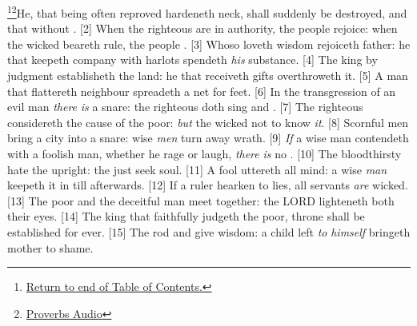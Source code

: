 \footnote{\textcolor[cmyk]{0.99998,1,0,0}{\hyperlink{TOC}{Return to end of Table of Contents.}}}\footnote{\href{https://audiobible.com/bible}{\textcolor[cmyk]{0.99998,1,0,0}{Proverbs Audio}}}\textcolor[cmyk]{0.99998,1,0,0}{He, that being often reproved hardeneth  neck, shall suddenly be destroyed, and that without .}
[2] \textcolor[cmyk]{0.99998,1,0,0}{When the righteous are in authority, the people rejoice:  when the wicked beareth rule, the people .}
[3] \textcolor[cmyk]{0.99998,1,0,0}{Whoso loveth wisdom rejoiceth  father:  he that keepeth company with harlots spendeth \emph{his} substance.}
[4] \textcolor[cmyk]{0.99998,1,0,0}{The king by judgment establisheth the land:  he that receiveth gifts overthroweth it.}
[5] \textcolor[cmyk]{0.99998,1,0,0}{A man that flattereth  neighbour spreadeth a net for  feet.}
[6] \textcolor[cmyk]{0.99998,1,0,0}{In the transgression of an evil man \emph{there} \emph{is} a snare:  the righteous doth sing and .}
[7] \textcolor[cmyk]{0.99998,1,0,0}{The righteous considereth the cause of the poor: \emph{but} the wicked  not to know \emph{it}.}
[8] \textcolor[cmyk]{0.99998,1,0,0}{Scornful men bring a city into a snare:  wise \emph{men} turn away wrath.}
[9] \textcolor[cmyk]{0.99998,1,0,0}{\emph{If} a wise man contendeth with a foolish man, whether he rage or laugh, \emph{there} \emph{is} no .}
[10] \textcolor[cmyk]{0.99998,1,0,0}{The bloodthirsty hate the upright:  the just seek  soul.}
[11] \textcolor[cmyk]{0.99998,1,0,0}{A fool uttereth all  mind:  a wise \emph{man} keepeth it in till afterwards.}
[12] \textcolor[cmyk]{0.99998,1,0,0}{If a ruler hearken to lies, all  servants \emph{are} wicked.}
[13] \textcolor[cmyk]{0.99998,1,0,0}{The poor and the deceitful man meet together: the LORD lighteneth both their eyes.}
[14] \textcolor[cmyk]{0.99998,1,0,0}{The king that faithfully judgeth the poor,  throne shall be established for ever.}
[15] \textcolor[cmyk]{0.99998,1,0,0}{The rod and  give wisdom:  a child left \emph{to} \emph{himself} bringeth  mother to shame.}
